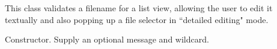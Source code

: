 \section{}\label{wxfilenamelistvalidator}


This class validates a filename for a list view, allowing the user to edit it textually and also popping up
a file selector in ``detailed editing" mode.



Constructor. Supply an optional message and wildcard.

